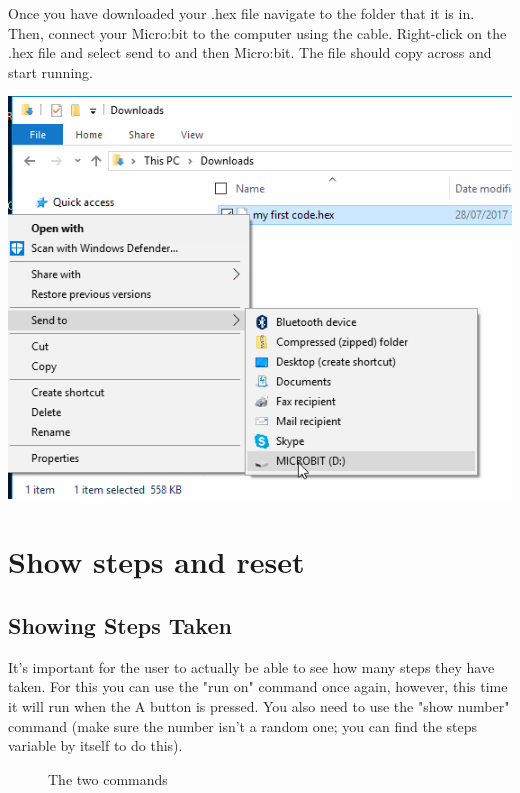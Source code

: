 \documentclass{article}
\begin{document}
Once you have downloaded your .hex file navigate to the folder that it is in. Then, connect your Micro:bit to the computer using the cable. Right-click on the .hex file and select send to and then Micro:bit. The file should copy across and start running.
\begin{center}
	\includegraphics[scale=0.7]{sendto}
\end{center}
\newpage
\section{Show steps and reset}
\subsection{Showing Steps Taken}
It's important for the user to actually be able to see how many steps they have taken. For this you can use the "run on" command once again, however, this time it will run when the A button is pressed. You also need to use the "show number" command (make sure the number isn't a random one; you can find the steps variable by itself to do this).
\begin{figure}[!hp]
  \centering
  \hfill
  \caption{The two commands}
\end{figure}
\end{document}
